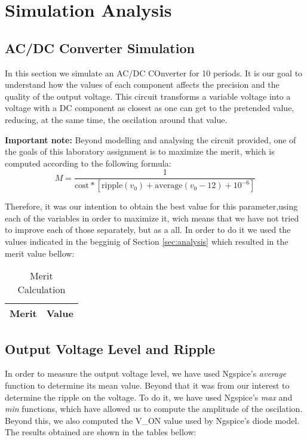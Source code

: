 \section{Simulation Analysis}
\label{sec:simulation}

\subsection{AC/DC Converter Simulation}
\label{subsec:circuit_simulation}
\par In this section we simulate an AC/DC COnverter for 10 periods. It is our goal to understand how the values of each component affects the precision and the quality of the output voltage. This circuit transforms a variable voltage into a voltage with a DC component as closest as one can get to the pretended value, reducing, at the same time, the oscilation around that value.

\par  \textbf{Important note:} Beyond modelling and analysing the circuit provided, one of the goals of this laboratory assignment is to maximize the merit, which is computed according to the following formula:
\begin{equation}
M = \frac{1}{\text{cost}*[\text{ripple}(v_0)+\text{average}(v_{0}-12)+10^{-6}]}
\end{equation}

Therefore, it was our intention to obtain the best value for this parameter,using each of the variables in order to maximize it, wich means that we have not tried to improve each of those separately, but as a all.
In order to do it we used the values indicated in the begginig of Section \ref{sec:analysis} which resulted in the merit value bellow:

\begin{table}[H]
  \centering
  \begin{tabular}{|l|r|}
    \hline    
    {\bf Merit} & {\bf Value} \\ \hline
    
  \end{tabular}
  \caption{Merit Calculation}
  \label{tab:merit}
\end{table}



\subsection{Output Voltage Level and Ripple}
\label{subsec:out_voltage}
In order to measure the output voltage level, we have used Ngspice's \textit{average} function to determine its mean value. Beyond that it was from our interest to determine the ripple on the voltage. To do it, we have used Ngspice's \textit{max} and \textit{min} functions, which have allowed us to compute the amplitude of the oscilation. Beyond this, we also computed the V_{ON} value used by Ngspice's diode model. The results obtained are shown in the tables bellow:


